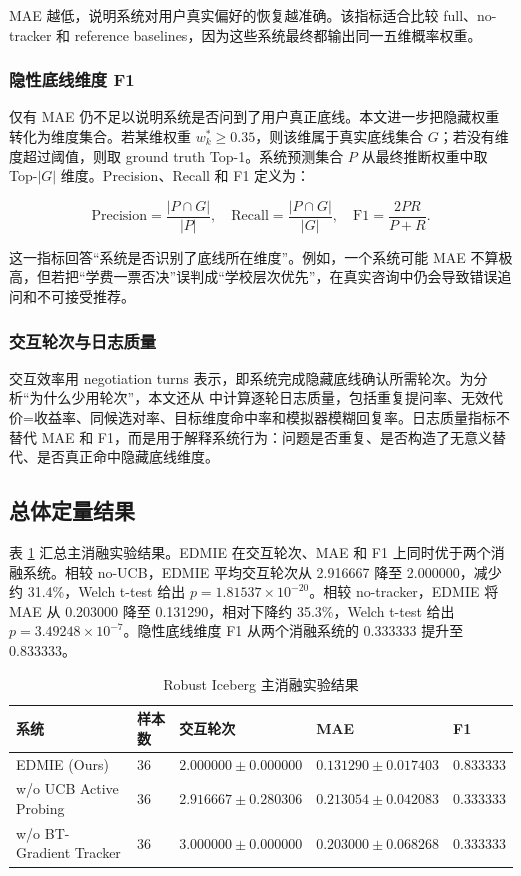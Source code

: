 MAE 越低，说明系统对用户真实偏好的恢复越准确。该指标适合比较 full、no-tracker 和 reference baselines，因为这些系统最终都输出同一五维概率权重。

\subsubsection{隐性底线维度 F1}

仅有 MAE 仍不足以说明系统是否问到了用户真正底线。本文进一步把隐藏权重转化为维度集合。若某维权重 $w^{*}_{k}\geq 0.35$，则该维属于真实底线集合 $G$；若没有维度超过阈值，则取 ground truth Top-1。系统预测集合 $P$ 从最终推断权重中取 Top-$|G|$ 维度。Precision、Recall 和 F1 定义为：

\[
\mathrm{Precision}=\frac{|P\cap G|}{|P|},\quad
\mathrm{Recall}=\frac{|P\cap G|}{|G|},\quad
\mathrm{F1}=\frac{2PR}{P+R}.
\]

这一指标回答“系统是否识别了底线所在维度”。例如，一个系统可能 MAE 不算极高，但若把“学费一票否决”误判成“学校层次优先”，在真实咨询中仍会导致错误追问和不可接受推荐。

\subsubsection{交互轮次与日志质量}

交互效率用 negotiation turns 表示，即系统完成隐藏底线确认所需轮次。为分析“为什么少用轮次”，本文还从  中计算逐轮日志质量，包括重复提问率、无效代价=收益率、同候选对率、目标维度命中率和模拟器模糊回复率。日志质量指标不替代 MAE 和 F1，而是用于解释系统行为：问题是否重复、是否构造了无意义替代、是否真正命中隐藏底线维度。

\subsection{总体定量结果}

表 \ref{tab:robust-main-results} 汇总主消融实验结果。EDMIE 在交互轮次、MAE 和 F1 上同时优于两个消融系统。相较 no-UCB，EDMIE 平均交互轮次从 2.916667 降至 2.000000，减少约 31.4\%，Welch t-test 给出 $p=1.81537\times 10^{-20}$。相较 no-tracker，EDMIE 将 MAE 从 0.203000 降至 0.131290，相对下降约 35.3\%，Welch t-test 给出 $p=3.49248\times 10^{-7}$。隐性底线维度 F1 从两个消融系统的 0.333333 提升至 0.833333。

\begin{table}[htbp]
\centering
\caption{Robust Iceberg 主消融实验结果}
\label{tab:robust-main-results}
\scriptsize
\setlength{\tabcolsep}{3pt}
\begin{tabular}{p{}p{}p{}p{}p{}}
\hline
系统 & 样本数 & 交互轮次 & MAE & F1 \\
\hline
EDMIE (Ours) & 36 & $2.000000\pm0.000000$ & $0.131290\pm0.017403$ & 0.833333 \\
w/o UCB Active Probing & 36 & $2.916667\pm0.280306$ & $0.213054\pm0.042083$ & 0.333333 \\
w/o BT-Gradient Tracker & 36 & $3.000000\pm0.000000$ & $0.203000\pm0.068268$ & 0.333333 \\
\hline
\end{tabular}
\end{table}


